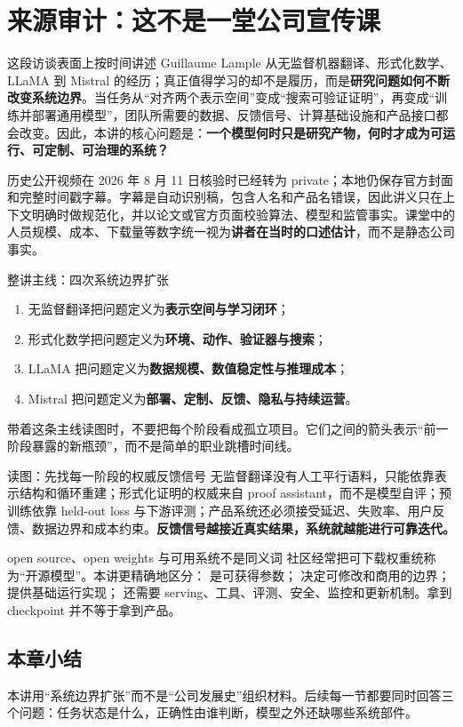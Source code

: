 \section{来源审计：这不是一堂公司宣传课}

这段访谈表面上按时间讲述 Guillaume Lample 从无监督机器翻译、形式化数学、LLaMA 到 Mistral 的经历；真正值得学习的却不是履历，而是\textbf{研究问题如何不断改变系统边界}。当任务从“对齐两个表示空间”变成“搜索可验证证明”，再变成“训练并部署通用模型”，团队所需要的数据、反馈信号、计算基础设施和产品接口都会改变。因此，本讲的核心问题是：\textbf{一个模型何时只是研究产物，何时才成为可运行、可定制、可治理的系统？}

历史公开视频在 2026 年 8 月 11 日核验时已经转为 private；本地仍保存官方封面和完整时间戳字幕。字幕是自动识别稿，包含人名和产品名错误，因此讲义只在上下文明确时做规范化，并以论文或官方页面校验算法、模型和监管事实。课堂中的人员规模、成本、下载量等数字统一视为\textbf{讲者在当时的口述估计}，而不是静态公司事实。

\begin{importantbox}{整讲主线：四次系统边界扩张}
\begin{enumerate}
  \item 无监督翻译把问题定义为\textbf{表示空间与学习闭环}；
  \item 形式化数学把问题定义为\textbf{环境、动作、验证器与搜索}；
  \item LLaMA 把问题定义为\textbf{数据规模、数值稳定性与推理成本}；
  \item Mistral 把问题定义为\textbf{部署、定制、反馈、隐私与持续运营}。
\end{enumerate}
\end{importantbox}

带着这条主线读图时，不要把每个阶段看成孤立项目。它们之间的箭头表示“前一阶段暴露的新瓶颈”，而不是简单的职业跳槽时间线。


\begin{knowledgebox}{读图：先找每一阶段的权威反馈信号}
无监督翻译没有人工平行语料，只能依靠表示结构和循环重建；形式化证明的权威来自 proof assistant，而不是模型自评；预训练依靠 held-out loss 与下游评测；产品系统还必须接受延迟、失败率、用户反馈、数据边界和成本约束。\textbf{反馈信号越接近真实结果，系统就越能进行可靠迭代。}
\end{knowledgebox}

\begin{warningbox}{open source、open weights 与可用系统不是同义词}
社区经常把可下载权重统称为“开源模型”。本讲更精确地区分： 是可获得参数； 决定可修改和商用的边界； 提供基础运行实现； 还需要 serving、工具、评测、安全、监控和更新机制。拿到 checkpoint 并不等于拿到产品。
\end{warningbox}

\subsection{本章小结}

本讲用“系统边界扩张”而不是“公司发展史”组织材料。后续每一节都要同时回答三个问题：任务状态是什么，正确性由谁判断，模型之外还缺哪些系统部件。

